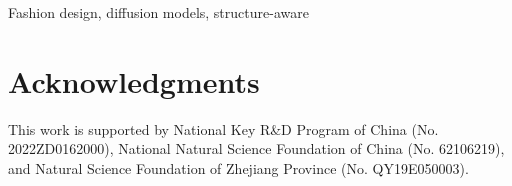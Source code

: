 \documentclass[lettersize,journal]{IEEEtran}
\begin{document}
\maketitle



\begin{IEEEkeywords}
Fashion design, diffusion models, structure-aware
\end{IEEEkeywords}








\section*{Acknowledgments}
This work is supported by National Key R\&D Program of China (No. 2022ZD0162000), National Natural Science Foundation of China (No. 62106219), and Natural Science Foundation of Zhejiang Province (No. QY19E050003).










\end{document}
